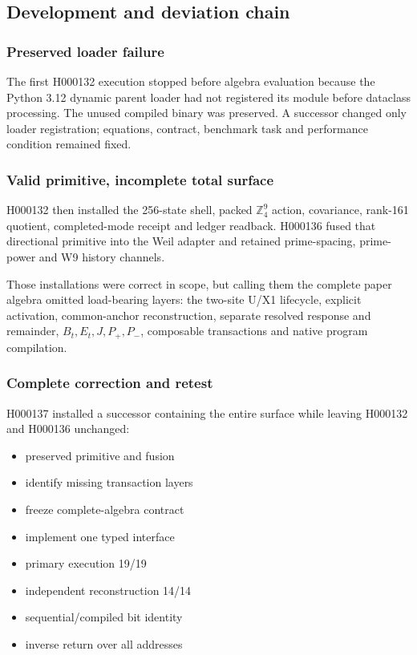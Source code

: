\subsection{Development and deviation
chain}\label{viii-ch04-development-and-deviation-chain}

\subsubsection{Preserved loader failure}\label{viii-ch04-preserved-loader-failure}

The first H000132 execution stopped before algebra evaluation because
the Python 3.12 dynamic parent loader had not registered its module
before dataclass processing. The unused compiled binary was preserved. A
successor changed only loader registration; equations, contract,
benchmark task and performance condition remained fixed.

\subsubsection{Valid primitive, incomplete total
surface}\label{viii-ch04-valid-primitive-incomplete-total-surface}

H000132 then installed the 256-state shell, packed \(\mathbb Z_4^9\)
action, covariance, rank-161 quotient, completed-mode receipt and ledger
readback. H000136 fused that directional primitive into the Weil adapter
and retained prime-spacing, prime-power and W9 history channels.

Those installations were correct in scope, but calling them the complete
paper algebra omitted load-bearing layers: the two-site U/X1 lifecycle,
explicit activation, common-anchor reconstruction, separate resolved
response and remainder, \(B_t,E_t,J,P_+,P_-\), composable transactions
and native program compilation.

\subsubsection{Complete correction and
retest}\label{viii-ch04-complete-correction-and-retest}

H000137 installed a successor containing the entire surface while
leaving H000132 and H000136 unchanged:

\begin{itemize}
\tightlist
\item
  preserved primitive and fusion
\item
  identify missing transaction layers
\item
  freeze complete-algebra contract
\item
  implement one typed interface
\item
  primary execution 19/19
\item
  independent reconstruction 14/14
\item
  sequential/compiled bit identity
\item
  inverse return over all addresses
\end{itemize}

